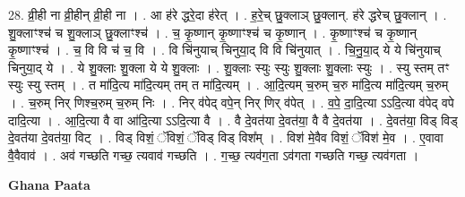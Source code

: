 \documentclass[17pt]{extarticle}
\begin{document}
28. व्री॒ही ना व्री॒हीन् व्री॒ही ना । . आ ह॑रे द्धरे॒दा ह॑रेत् । . ह॒रे॒च् छु॒क्लाञ् छु॒क्लान्. ह॑रे द्धरेच् छु॒क्लान् । . शु॒क्लाꣳश्च॑ च शु॒क्लाञ् छु॒क्लाꣳश्च॑ । . च॒ कृ॒ष्णान् कृ॒ष्णाꣳश्च॑ च कृ॒ष्णान् । . कृ॒ष्णाꣳश्च॑ च कृ॒ष्णान् कृ॒ष्णाꣳश्च॑ । . च॒ वि वि च॑ च॒ वि । . वि चि॑नुयाच् चिनुया॒द् वि वि चि॑नुयात् । . चि॒नु॒या॒द् ये ये चि॑नुयाच् चिनुया॒द् ये । . ये शु॒क्लाः शु॒क्ला ये ये शु॒क्लाः । . शु॒क्लाः स्युः स्युः शु॒क्लाः शु॒क्लाः स्युः । . स्यु स्तम् तꣳ स्युः स्यु स्तम् । . त मा॑दि॒त्य मा॑दि॒त्यम् तम् त मा॑दि॒त्यम् । . आ॒दि॒त्यम् च॒रुम् च॒रु मा॑दि॒त्य मा॑दि॒त्यम् च॒रुम् । . च॒रुम् निर् णिश्च॒रुम् च॒रुम् निः । . निर् व॑पेद् वपे॒न् निर् णिर् व॑पेत् । . व॒पे॒ दा॒दि॒त्या ऽऽदि॒त्या व॑पेद् वपे दादि॒त्या । . आ॒दि॒त्या वै वा आ॑दि॒त्या ऽऽदि॒त्या वै । . वै दे॒वत॑या दे॒वत॑या॒ वै वै दे॒वत॑या । . दे॒वत॑या॒ विड् विड् दे॒वत॑या दे॒वत॑या॒ विट् । . विड् विशं॒ ॅविशं॒ ॅविड् विड् विश᳚म् । . विश॑ मे॒वैव विशं॒ ॅविश॑ मे॒व । . ए॒वावा वै॒वैवाव॑ । . अव॑ गच्छति गच्छ॒ त्यवाव॑ गच्छति । . ग॒च्छ॒ त्यव॑ग॒ता ऽव॑गता गच्छति गच्छ॒ त्यव॑गता । \newline

\textbf{Ghana Paata } \newline
\end{document}
